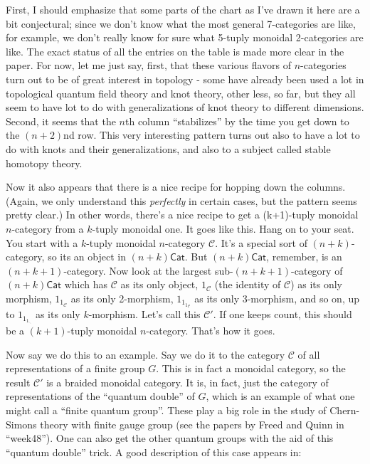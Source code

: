 \documentclass{article}
\begin{document}
First, I should emphasize that some parts of the chart as I've drawn it
here are a bit conjectural; since we don't know what the most general
7-categories are like, for example, we don't really know for sure what
5-tuply monoidal 2-categories are like. The exact status of all the
entries on the table is made more clear in the paper. For now, let me
just say, first, that these various flavors of \(n\)-categories turn out
to be of great interest in topology - some have already been used a lot
in topological quantum field theory and knot theory, other less, so far,
but they all seem to have lot to do with generalizations of knot theory
to different dimensions. Second, it seems that the \(n\)th column
``stabilizes'' by the time you get down to the \((n+2)\)nd row. This
very interesting pattern turns out also to have a lot to do with knots
and their generalizations, and also to a subject called stable homotopy
theory.

Now it also appears that there is a nice recipe for hopping down the
columns. (Again, we only understand this \emph{perfectly} in certain
cases, but the pattern seems pretty clear.) In other words, there's a
nice recipe to get a (k+1)-tuply monoidal \(n\)-category from a
\(k\)-tuply monoidal one. It goes like this. Hang on to your seat. You
start with a \(k\)-tuply monoidal \(n\)-category \(\mathcal{C}\). It's a
special sort of \((n+k)\)-category, so its an object in
\((n+k)\mathsf{Cat}\). But \((n+k)\mathsf{Cat}\), remember, is an
\((n+k+1)\)-category. Now look at the largest sub-\((n+k+1)\)-category
of \((n+k)\mathsf{Cat}\) which has \(\mathcal{C}\) as its only object,
\(1_{\mathcal{C}}\) (the identity of \(\mathcal{C}\)) as its only
morphism, \(1_{1_{\mathcal{C}}}\) as its only 2-morphism,
\(1_{1_{1_{\mathcal{C}}}}\) as its only 3-morphism, and so on, up to
\(1_{1_{1_{\ddots}}}\) as its only \(k\)-morphism. Let's call this
\(\mathcal{C}'\). If one keeps count, this should be a \((k+1)\)-tuply
monoidal \(n\)-category. That's how it goes.

Now say we do this to an example. Say we do it to the category
\(\mathcal{C}\) of all representations of a finite group \(G\). This is
in fact a monoidal category, so the result \(\mathcal{C}'\) is a braided
monoidal category. It is, in fact, just the category of representations
of the ``quantum double'' of \(G\), which is an example of what one
might call a ``finite quantum group''. These play a big role in the
study of Chern-Simons theory with finite gauge group (see the papers by
Freed and Quinn in ``week48''). One can also get the other quantum
groups with the aid of this ``quantum double'' trick. A good description
of this case appears in:
\end{document}
